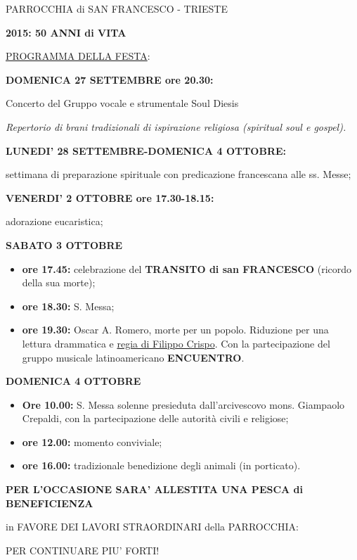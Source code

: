\documentclass[17pt,titlepage,extrafontsizes]{memoir}
\begin{document}
\pagestyle{empty}
\begin{center}
{\LARGE PARROCCHIA di SAN FRANCESCO - TRIESTE\par
\vspace{1cm}
\textbf{2015: 50 ANNI di VITA}}
\end{center}
\vfill
{\Large \ul{PROGRAMMA DELLA FESTA}:}
\par\bigskip\bigskip
\textbf{\Large DOMENICA 27 SETTEMBRE ore 20.30:}
\par\medskip
{\large Concerto del  Gruppo vocale e strumentale Soul Diesis\par}
\textit{Repertorio di brani tradizionali di ispirazione religiosa (spiritual soul e gospel).}
\par\bigskip\bigskip
\textbf{\Large LUNEDI’ 28 SETTEMBRE-DOMENICA 4 OTTOBRE:}
\par\medskip
{\large settimana di preparazione spirituale con predicazione francescana alle ss. Messe;}
\par\bigskip\bigskip
\textbf{\Large VENERDI’ 2 OTTOBRE ore 17.30-18.15:}
\par\medskip
{\large adorazione eucaristica;}
\par\bigskip\bigskip
\textbf{\Large SABATO 3 OTTOBRE}
\par\medskip
\begin{itemize}
 \large
 \item \textbf{ore 17.45:} celebrazione del \textbf{TRANSITO di san FRANCESCO} (ricordo della sua morte);
 \item \textbf{ore 18.30:} S. Messa;
 \item \textbf{ore 19.30:} Oscar A. Romero, morte per un popolo. Riduzione per una lettura drammatica e \ul{regia di Filippo Crispo}. Con la partecipazione del gruppo musicale latinoamericano \textbf{ENCUENTRO}.
\end{itemize}
\par\bigskip\bigskip
\textbf{\Large DOMENICA 4 OTTOBRE}
\par\medskip
\begin{itemize}
 \large
 \item \textbf{Ore 10.00:} S. Messa solenne presieduta dall’arcivescovo mons. Giampaolo Crepaldi, con la partecipazione delle autorità civili e religiose;
 \item \textbf{ore 12.00:} momento conviviale;
 \item \textbf{ore 16.00:} tradizionale benedizione degli animali (in porticato).
\end{itemize}
\vfill
\begin{center}
\large\bfseries 
PER L’OCCASIONE SARA’ ALLESTITA UNA PESCA di BENEFICIENZA\par
in FAVORE DEI LAVORI STRAORDINARI della PARROCCHIA:\par
\Large PER CONTINUARE PIU’ FORTI!
\end{center}
\vfill
\newpage
\end{document}
